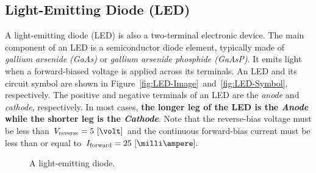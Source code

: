 \subsection{Light-Emitting Diode (LED)}
\label{sec:light-emitting-diode}
A light-emitting diode (LED) is also a two-terminal electronic device. The main
component of an LED is a semiconductor diode element, typically made of
\emph{gallium arsenide (GaAs)} or \emph{gallium arsenide phosphide (GaAsP)}. It
emits light when a forward-biased voltage is applied across its terminals. An
LED and its circuit symbol are shown in
Figure~\ref{fig:LED-Image}~and~\ref{fig:LED-Symbol}, respectively. The positive
and negative terminals of an LED are the \emph{anode} and \emph{cathode},
respectively. In most cases, \textbf{the longer leg of the LED is the \emph{Anode} while
the shorter leg is the \emph{Cathode}}. Note that the reverse-bias voltage must
be less than $V_{\text{reverse}}=5~[\volt]$ and the continuous forward-bias
current must be less than or equal to $I_{\text{forward}}=25~[\milli\ampere].$ %
%
\begin{figure}
  \centering
  \caption{A light-emitting diode.}
  \label{fig:LED}
\end{figure}
%


